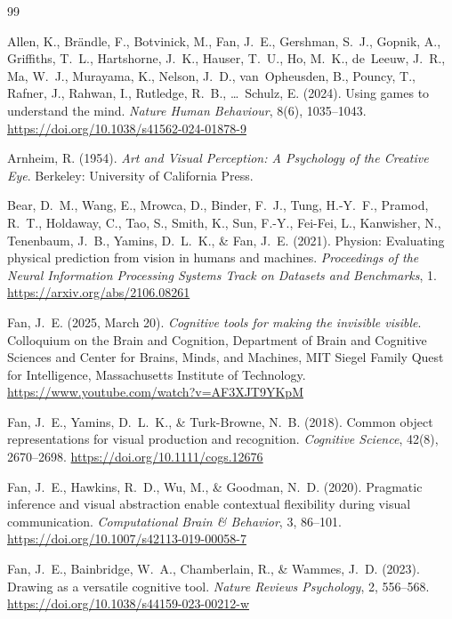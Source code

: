 \documentclass[11pt]{article}
\theoremstyle{remark}
\begin{document}
\begin{thebibliography}{99}
\small

Allen, K., Br\"andle, F., Botvinick, M., Fan, J.~E., Gershman, S.~J., Gopnik, A., Griffiths, T.~L., Hartshorne, J.~K., Hauser, T.~U., Ho, M.~K., de~Leeuw, J.~R., Ma, W.~J., Murayama, K., Nelson, J.~D., van~Opheusden, B., Pouncy, T., Rafner, J., Rahwan, I., Rutledge, R.~B., \ldots\ Schulz, E. (2024).
Using games to understand the mind.
\emph{Nature Human Behaviour}, 8(6), 1035--1043.
\url{https://doi.org/10.1038/s41562-024-01878-9}

Arnheim, R. (1954).
\emph{Art and Visual Perception: A Psychology of the Creative Eye}.
Berkeley: University of California Press.

Bear, D.~M., Wang, E., Mrowca, D., Binder, F.~J., Tung, H.-Y.~F., Pramod, R.~T., Holdaway, C., Tao, S., Smith, K., Sun, F.-Y., Fei-Fei, L., Kanwisher, N., Tenenbaum, J.~B., Yamins, D.~L.~K., \& Fan, J.~E. (2021).
Physion: Evaluating physical prediction from vision in humans and machines.
\emph{Proceedings of the Neural Information Processing Systems Track on Datasets and Benchmarks}, 1.
\url{https://arxiv.org/abs/2106.08261}

Fan, J.~E. (2025, March 20).
\emph{Cognitive tools for making the invisible visible}.
Colloquium on the Brain and Cognition, Department of Brain and Cognitive Sciences and Center for Brains, Minds, and Machines, MIT Siegel Family Quest for Intelligence, Massachusetts Institute of Technology.
\url{https://www.youtube.com/watch?v=AF3XJT9YKpM}

Fan, J.~E., Yamins, D.~L.~K., \& Turk-Browne, N.~B. (2018).
Common object representations for visual production and recognition.
\emph{Cognitive Science}, 42(8), 2670--2698.
\url{https://doi.org/10.1111/cogs.12676}

Fan, J.~E., Hawkins, R.~D., Wu, M., \& Goodman, N.~D. (2020).
Pragmatic inference and visual abstraction enable contextual flexibility during visual communication.
\emph{Computational Brain \& Behavior}, 3, 86--101.
\url{https://doi.org/10.1007/s42113-019-00058-7}

Fan, J.~E., Bainbridge, W.~A., Chamberlain, R., \& Wammes, J.~D. (2023).
Drawing as a versatile cognitive tool.
\emph{Nature Reviews Psychology}, 2, 556--568.
\url{https://doi.org/10.1038/s44159-023-00212-w}


\end{thebibliography}
\end{document}
